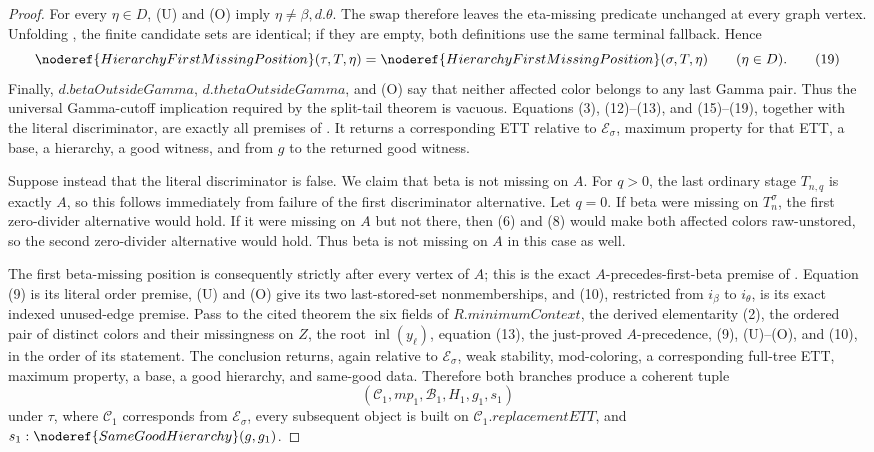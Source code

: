 \begin{proof}
{For every $\eta\in D$, (U) and (O) imply
$\eta\ne\beta,d.\theta$.  The swap therefore leaves the eta-missing
predicate unchanged at every graph vertex.  Unfolding
, the finite candidate sets are
identical; if they are empty, both definitions use the same terminal
fallback.  Hence
\[
 \noderef{HierarchyFirstMissingPosition}(\tau,T,\eta)
 =\noderef{HierarchyFirstMissingPosition}(\sigma,T,\eta)
                         \qquad(\eta\in D).                    \tag{19}
\]
Finally, $d.\mathit{betaOutsideGamma}$, $d.\mathit{thetaOutsideGamma}$,
and (O) say that neither affected color belongs to any last Gamma pair.
Thus the universal Gamma-cutoff implication required by the split-tail
theorem is vacuous.  Equations (3), (12)--(13), and (15)--(19), together
with the literal discriminator, are exactly all premises of
.  It returns a corresponding
ETT relative to $\mathcal E_\sigma$, maximum property for that ETT, a
base, a hierarchy, a good witness, and
 from $g$ to the returned good witness.

Suppose instead that the literal discriminator is false.  We claim that
beta is not missing on $A$.  For $q>0$, the last ordinary stage
$T_{n,q}$ is exactly $A$, so this follows immediately from failure of
the first discriminator alternative.  Let $q=0$.  If beta were missing
on $T_n^\sigma$, the first zero-divider alternative would hold.  If it
were missing on $A$ but not there, then (6) and (8) would make both
affected colors raw-unstored, so the second zero-divider alternative
would hold.  Thus beta is not missing on $A$ in this case as well.

The first beta-missing position is consequently strictly after every
vertex of $A$; this is the exact $A$-precedes-first-beta premise of
.  Equation (9) is its literal order
premise, (U) and (O) give its two last-stored-set nonmemberships, and
(10), restricted from $i_\beta$ to $i_\theta$, is its exact indexed
unused-edge premise.  Pass to the cited theorem the six fields of
$R.\mathit{minimumContext}$, the derived elementarity (2), the ordered
pair of distinct colors and their missingness on $Z$, the root
$\operatorname{inl}(y_\ell)$, equation (13), the just-proved
$A$-precedence, (9), (U)--(O), and (10), in the order of its statement.
The  conclusion returns, again relative to $\mathcal E_\sigma$,
weak stability, mod-coloring, a corresponding full-tree ETT, maximum
property, a base, a good hierarchy, and same-good data.  Therefore both
branches produce a coherent tuple
\[
 (\mathcal C_1,\mathit{mp}_1,\mathcal B_1,H_1,g_1,s_1)          \tag{20}
\]
under $\tau$, where $\mathcal C_1$ corresponds from
$\mathcal E_\sigma$, every subsequent object is built on
$\mathcal C_1.\mathit{replacementETT}$, and
$s_1:\noderef{SameGoodHierarchy}(g,g_1)$.

}
\end{proof}
